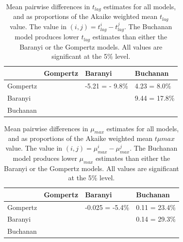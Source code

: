 \documentclass[11pt, a4paper]{article}
\begin{document}
\begin{linenumbers}
\begin{table}[H]
\centering
\begin{tabular}{l|lll}
         & Gompertz                                        & Baranyi                                         & Buchanan                 \\ \hline
Gompertz & \cellcolor[HTML]{9B9B9B}                        & -5.21 = - 9.8\%                                           & 4.23 = 8.0\%                     \\
Baranyi  & \cellcolor[HTML]{9B9B9B}{\color[HTML]{9B9B9B} } & \cellcolor[HTML]{9B9B9B}{\color[HTML]{9B9B9B} } & 9.44 = 17.8\%                     \\
Buchanan & \cellcolor[HTML]{9B9B9B}{\color[HTML]{9B9B9B} } & \cellcolor[HTML]{9B9B9B}                        & \cellcolor[HTML]{9B9B9B}
\end{tabular}
\caption{Mean pairwise differences in $t_{lag}$ estimates for all models, and as proportions of the Akaike weighted mean $t_{lag}$ value. The value in $(i, j) = t_{lag}^i - t_{lag}^j$. The Buchanan model produces lower $t_{lag}$ estimates than either the Baranyi or the Gompertz models. All values are significant at the 5\% level.}
\label{tab:tlag_biases}
\end{table}


\begin{table}[H]
\centering
\begin{tabular}{l|lll}
         & Gompertz                                        & Baranyi                                         & Buchanan                 \\ \hline
Gompertz & \cellcolor[HTML]{9B9B9B}                        & -0.025 = -5.4\%                                           & 0.11 = 23.4\%                     \\
Baranyi  & \cellcolor[HTML]{9B9B9B}{\color[HTML]{9B9B9B} } & \cellcolor[HTML]{9B9B9B}{\color[HTML]{9B9B9B} } & 0.14 = 29.3\%                     \\
Buchanan & \cellcolor[HTML]{9B9B9B}{\color[HTML]{9B9B9B} } & \cellcolor[HTML]{9B9B9B}                        & \cellcolor[HTML]{9B9B9B}
\end{tabular}
\caption{Mean pairwise differences in $\mu_{max}$ estimates for all models, and as proportions of the Akaike weighted mean $t\mu{max}$ value. The value in $(i, j) = \mu_{max}^i - \mu_{max}^j$. The Buchanan model produces lower $\mu_{max}$ estimates than either the Baranyi or the Gompertz models. All values are significant at the 5\% level.}
\label{tab:rmax_biases}
\end{table}


\end{linenumbers}
\end{document}
